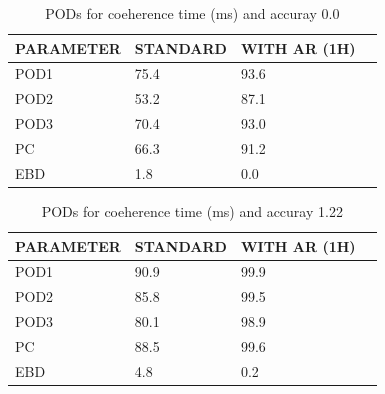 \documentclass[a4paper,english]{article}
\begin{document}
\begin{table}[]
\begin{center}
\begin{tabular}{|l|l|l|l|}
\hline
\multicolumn{1}{|c|}{\cellcolor[HTML]{C0C0C0}\textbf{PARAMETER}} & \multicolumn{1}{c|}{\cellcolor[HTML]{C0C0C0}\textbf{STANDARD}} & \multicolumn{1}{c|}{\cellcolor[HTML]{C0C0C0}\textbf{WITH AR (1H)}} \\
\hline
\cellcolor[HTML]{C0C0C0}POD1  & 75.4                                & 93.6         \\
\cellcolor[HTML]{C0C0C0}POD2  & 53.2                                & 87.1         \\
\cellcolor[HTML]{C0C0C0}POD3  & 70.4                                & 93.0         \\
\cellcolor[HTML]{C0C0C0}PC    & 66.3                                  & 91.2           \\
\cellcolor[HTML]{C0C0C0}EBD   & 1.8                                 & 0.0          \\
\hline
\end{tabular}
\caption{PODs for coeherence time (ms) and accuray 0.0}
\end{center}
\end{table}
\begin{table}[]
\begin{center}
\begin{tabular}{|l|l|l|l|}
\hline
\multicolumn{1}{|c|}{\cellcolor[HTML]{C0C0C0}\textbf{PARAMETER}} & \multicolumn{1}{c|}{\cellcolor[HTML]{C0C0C0}\textbf{STANDARD}} & \multicolumn{1}{c|}{\cellcolor[HTML]{C0C0C0}\textbf{WITH AR (1H)}} \\
\hline
\cellcolor[HTML]{C0C0C0}POD1  & 90.9                                & 99.9         \\
\cellcolor[HTML]{C0C0C0}POD2  & 85.8                                & 99.5         \\
\cellcolor[HTML]{C0C0C0}POD3  & 80.1                                & 98.9         \\
\cellcolor[HTML]{C0C0C0}PC    & 88.5                                  & 99.6           \\
\cellcolor[HTML]{C0C0C0}EBD   & 4.8                                 & 0.2          \\
\hline
\end{tabular}
\caption{PODs for coeherence time (ms) and accuray 1.22}
\end{center}
\end{table}
\end{document}
